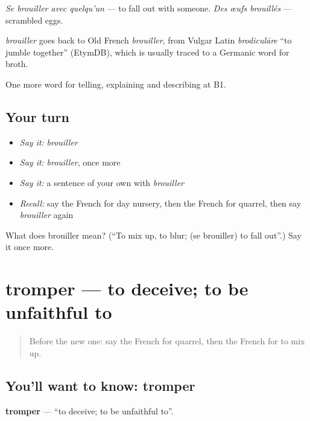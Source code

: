 \emph{Se brouiller avec quelqu'un} — to fall out with someone. \emph{Des œufs brouillés} — scrambled eggs.

\begin{cousinweb}
\emph{brouiller} goes back to Old French \emph{brouiller}, from Vulgar Latin \emph{brodiculāre} \textquotedblleft{}to jumble together\textquotedblright{} (EtymDB), which is usually traced to a Germanic word for broth.
\end{cousinweb}

\begin{grammarlens}[title={What you've built}]
One more word for telling, explaining and describing at B1.
\end{grammarlens}

\subsection*{Your turn}
\begin{itemize}
\raggedright
  \item \emph{Say it:} \emph{brouiller}
  \item \emph{Say it:} \emph{brouiller}, once more
  \item \emph{Say it:} a sentence of your own with \emph{brouiller}
  \item \emph{Recall:} say the French for day nursery, then the French for quarrel, then say \emph{brouiller} again
\end{itemize}

\begin{tcolorbox}[breakable,colback=teal!4,colframe=teal!35!black,title={Before you move on}]
What does brouiller mean? (\textquotedblleft{}To mix up, to blur; (se brouiller) to fall out\textquotedblright{}.) Say it once more.
\end{tcolorbox}
\section[tromper]{tromper — to deceive; to be unfaithful to}

\label{lesson:FR-C495-tromper}



\begin{quote}
Before the new one: say the French for quarrel, then the French for to mix up.
\end{quote}

\subsection*{You'll want to know: tromper}
\textbf{tromper} — \textquotedblleft{}to deceive; to be unfaithful to\textquotedblright{}.

